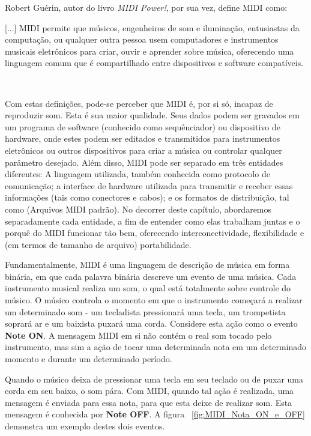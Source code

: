             Robert Guérin, autor do livro \textit{MIDI Power!}, por sua vez, define MIDI como: \epigraph{[...] MIDI permite que músicos, engenheiros de som e iluminação, entusiastas da computação, ou qualquer outra pessoa usem computadores e instrumentos musicais eletrônicos para criar, ouvir e aprender sobre música, oferecendo uma linguagem comum que é compartilhado entre dispositivos e software compatíveis.}{~\cite{Guerin}}

            Com estas definições, pode-se perceber que MIDI é, por si só, incapaz de reproduzir som. Esta é sua maior qualidade. Seus dados podem ser gravados em um programa de software (conhecido como sequênciador) ou dispositivo de hardware, onde estes podem ser editados e transmitidos para instrumentos eletrônicos ou outros dispositivos para criar a música ou controlar qualquer parâmetro desejado. Além disso, MIDI pode ser separado em três entidades diferentes: A linguagem utilizada, também conhecida como protocolo de comunicação; a interface de hardware utilizada para transmitir e receber essas informações (tais como conectores e cabos); e os formatos de distribuição, tal como  (Arquivos MIDI padrão). No decorrer deste capítulo, abordaremos separadamente cada entidade, a fim de entender como elas trabalham juntas e o porquê do MIDI funcionar tão bem, oferecendo interconectividade, flexibilidade e (em termos de tamanho de arquivo) portabilidade.

            Fundamentalmente, MIDI é uma linguagem de descrição de música em forma binária, em que cada palavra binária descreve um evento de uma música. Cada instrumento musical realiza um som, o qual está totalmente sobre controle do músico. O músico controla o momento em que o instrumento começará a realizar um determinado som - um tecladista pressionará uma tecla, um trompetista soprará ar e um baixista puxará uma corda. Considere esta ação como o evento \textbf{Note ON}. A mensagem MIDI em si não contém o real som tocado pelo instrumento, mas sim a ação de tocar uma determinada nota em um determinado momento e durante um determinado período.

            Quando o músico deixa de pressionar uma tecla em seu teclado ou de puxar uma corda em seu baixo, o som pára. Com MIDI, quando tal ação é realizada, uma mensagem é enviada para essa nota, para que esta deixe de realizar som. Esta mensagem é conhecida por \textbf{Note OFF}. A figura ~\ref{fig:MIDI_Nota_ON_e_OFF} demonstra um exemplo destes dois eventos.

